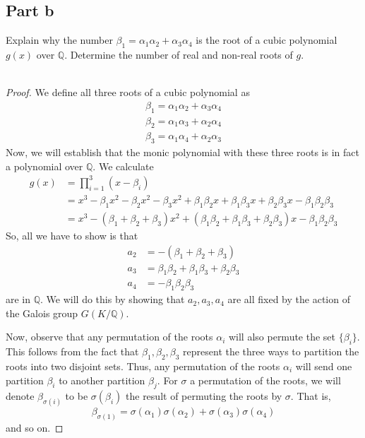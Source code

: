 \documentclass[12pt,reqno]{amsart}
\newcommand{\Q}{\mathbb{Q}}
\begin{document}
\subsection*{Part b}
Explain why the number $\beta_1 = \alpha_1\alpha_2 + \alpha_3\alpha_4$ is the
root of a cubic polynomial $g(x)$ over $\Q$. Determine the number of real and
non-real roots of $g$.
\\
\\
\begin{proof}
    We define all three roots of a cubic polynomial as
    \[
        \begin{aligned}
            \beta_1 = \alpha_1\alpha_2 + \alpha_3\alpha_4\\
            \beta_2 = \alpha_1\alpha_3 + \alpha_2\alpha_4\\
            \beta_3 = \alpha_1\alpha_4 + \alpha_2\alpha_3
        \end{aligned}
    \]
    Now, we will establish that the monic polynomial with these three roots is
    in fact a polynomial over $\Q$. We calculate
    \[
        \begin{aligned}
            g(x) &= \prod_{i=1}^3(x-\beta_i)\\
                &= x^3 -\beta_1x^2 -\beta_2x^2-\beta_3x^2 + \beta_1\beta_2x +
                \beta_1\beta_3x+\beta_2\beta_3x - \beta_1\beta_2\beta_3\\
                &= x^3 - (\beta_1+\beta_2+\beta_3)x^2 + (\beta_1\beta_2 +
                \beta_1\beta_3 + \beta_2\beta_3)x - \beta_1\beta_2\beta_3
        \end{aligned}
    \]
    So, all we have to show is that 
    \[
        \begin{aligned}
            a_2 &= -(\beta_1+\beta_2+\beta_3)\\
            a_3 &= \beta_1\beta_2 + \beta_1\beta_3 + \beta_2\beta_3\\
            a_4 &= -\beta_1\beta_2\beta_3
        \end{aligned}
    \]
    are in $\Q$. We will do this by showing that $a_2,a_3,a_4$ are all fixed
    by the action of the Galois group $G(K/\Q)$.

    Now, observe that any permutation of the roots $\alpha_i$ will also permute
    the set $\{\beta_i\}$. This follows from the fact that
    $\beta_1,\beta_2,\beta_3$ represent the three ways to partition the roots
    into two disjoint sets. Thus, any permutation of the roots $\alpha_i$ will
    send one partition $\beta_i$ to another partition $\beta_j$.  For $\sigma$ a
    permutation of the roots, we will denote $\beta_{\sigma(i)}$ to be
    $\sigma(\beta_i)$ the result of permuting the roots by $\sigma$. That is,
    \[
        \beta_{\sigma(1)} = \sigma(\alpha_1)\sigma(\alpha_2) +
        \sigma(\alpha_3)\sigma(\alpha_4)
    \]
    and so on.


\end{proof}
\end{document}
